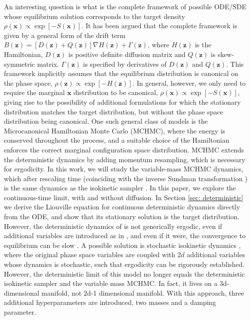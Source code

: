 \documentclass[tablecaption=bottom,wcp]{jmlr} %
\newcommand{\x}{\boldsymbol{x}}
\newcommand{\Z}{\boldsymbol{z}}
\begin{document}
An interesting question is
what is the complete framework of possible ODE/SDE
whose equilibrium solution corresponds to the
target density $\rho(\x) \propto \exp[-S(\x)]$. 
It has been argued \citep{Ma15} that the complete framework is 
given by a general form of the drift term $B(\Z)=[D(\Z)+Q(\Z)]\nabla H(\Z)+\Gamma(\Z)$, where $H(\Z)$
is the Hamiltonian, $D(\Z)$ is 
positive definite diffusion matrix and $Q(\Z)$ is skew-symmetric matrix. 
$\Gamma(\Z)$ is specified by derivatives
of $D(\Z)$ and $Q(\Z)$. 
This framework implicitly assumes 
that the equilibrium 
distribution is canonical on the phase space, $\rho(\Z) \propto \exp[-H(\Z)]$.
In general, however, 
we only need to require the marginal $\x$ distribution
to be canonical, $\rho(\x) \propto \exp[-S(\x)]$, giving
rise to the possibility of additional formulations for which the
stationary distribution matches the target distribution, but without the phase space distribution
being canonical.
One such general class of models is the 
Microcanonical Hamiltonian Monte Carlo \citep{MCHMC} (MCHMC), 
where the 
energy is conserved throughout 
the process, and a suitable choice of the Hamiltonian enforces the correct marginal configuration space distribution.
MCHMC extends the deterministic
dynamics \citep{ESH} by adding
momentum resampling, which
is necessary for ergodicity. 
In this work, we will study the variable-mass MCHMC dynamics, which after rescaling time (coinciding with the inverse Sundman transformation \citep{whatMakesMDwork,SimulatingHamiltonianDynamics})
is the same dynamics as the isokinetic sampler \citep{isokineticOld, isokinetic0}. In this paper, we explore the continuous-time limit, with
and without diffusion. In Section \ref{sec: deterministic} we derive the Liouville equation for continuous deterministic
dynamics directly from the ODE, and show
that its stationary solution is the target distribution. 
However, the deterministic dynamics of \cite{isokinetic0,ESH} is not generically ergodic, even if additional variables are introduced as in \cite{isokinetic1, isokinetic2}, and even if it were, the convergence to equilibrium can be slow \citep{MCHMC}.
A possible solution is stochastic isokinetic dynamics \citep{isokineticLangevin}, where the original phase space variables are coupled with $2d$ additional variables whose dynamics is stochastic, such that ergodicity can be rigorously established. However, the deterministic limit of this model no longer equals the deterministic isokinetic sampler and the variable mass MCHMC. In fact, it lives on a 3d-dimensional manifold, not 2d-1 dimensional manifold. With this approach, three additional hyperparameters are introduced, two masses and a damping parameter.
\end{document}
